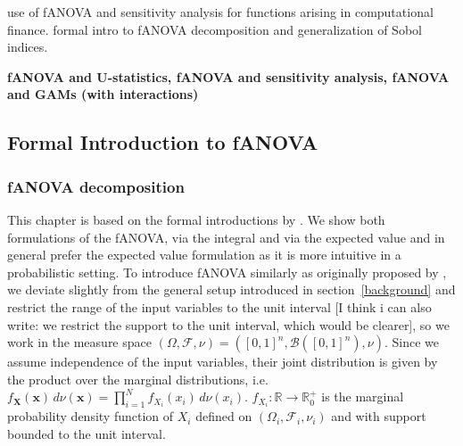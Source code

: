 \cite{liu2006} use of fANOVA and sensitivity analysis for functions arising in computational finance.
\cite{owen2013} formal intro to fANOVA decomposition and generalization of Sobol indices.

\textbf{fANOVA and U-statistics, fANOVA and sensitivity analysis, fANOVA and GAMs (with interactions)}

\subsection{Formal Introduction to fANOVA}

\subsubsection*{fANOVA decomposition}
This chapter is based on the formal introductions by \cite{rahman2014, sobol1993sensitivity, sobol2001, hooker2004, owen2013, muehlenstaedt2012}. We show both formulations of the fANOVA, via the integral and via the expected value and in general prefer the expected value formulation as it is more intuitive in a probabilistic setting.
To introduce fANOVA similarly as originally proposed by \cite{sobol1993sensitivity}, we deviate slightly from the general setup introduced in section~\ref{background} and restrict the range of the input variables to the unit interval [I think i can also write: we restrict the support to the unit interval, which would be clearer], so we work in the measure space $(\Omega, \mathcal{F}, \nu) = ([0, 1]^n, \mathcal{B}([0, 1]^n), \nu)$.
Since we assume independence of the input variables, their joint distribution is given by the product over the marginal distributions, i.e. \(f_{\boldsymbol{X}}(\boldsymbol{x}) \, d\nu(\boldsymbol{x}) = \prod_{i=1}^{N} f_{X_i}(x_i) \, d\nu(x_i)\). \(f_{X_i}: \mathbb{R} \rightarrow \mathbb{R}_{0}^{+}\) is the marginal probability density function of \(X_i\) defined on $(\Omega_i, \mathcal{F}_i, \nu_i)$ and with support bounded to the unit interval.



